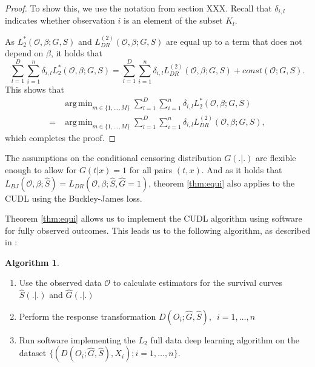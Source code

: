 \documentclass[12pt, a4paper]{article}
\theoremstyle{definition}
\newtheorem{Algorithm}{Algorithm}[section]
\theoremstyle{plain}
\numberwithin{equation}{section}
\numberwithin{figure}{section}
\numberwithin{table}{section}
\DeclareMathOperator*{\argmin}{arg\,min}
\begin{document}
\begin{proof}
		To show this, we use the notation from section XXX.
		Recall that $\delta_{i,l}$ indicates whether observation $i$ is an element of the subset $K_l$.
		
		As $L_2^*(\mathcal{O}, \beta; G,S)$ and $L_{DR}^{(2)}(\mathcal{O}, \beta; G,S)$ are equal up to a term that does not depend on $\beta$, it holds that
		\begin{equation*}
		\sum_{l=1}^{D} \sum_{i=1}^{n} \delta_{i,l} L_2^*(\mathcal{O}, \beta; G,S) = \sum_{l=1}^{D} \sum_{i=1}^{n} \delta_{i,l} L_{DR}^{(2)}(\mathcal{O}, \beta; G,S) + const(\mathcal{O}; G,S).
		\end{equation*}
		This shows that
		\begin{equation*}
		\begin{split}
		 &\argmin_{m \in \{1,\dots, M\}}\sum_{l=1}^{D} \sum_{i=1}^{n} \delta_{i,l} L_2^*(\mathcal{O}, \beta; G,S)\\
		  = &\argmin_{m \in \{1,\dots, M\}}\sum_{l=1}^{D} \sum_{i=1}^{n} \delta_{i,l} L_{DR}^{(2)}(\mathcal{O}, \beta; G,S),
		 \end{split}
		\end{equation*}
		which completes the proof.
	\end{proof}

	The assumptions on the conditional censoring distribution $G(.\vert .)$ are flexible enough to allow for $G(t\vert x)=1$ for all pairs $(t,x)$.
	And as it holds that $L_{BJ}(\mathcal{O}, \beta; \hat{S})=L_{DR}(\mathcal{O}, \beta; \hat{S}, \hat{G} = 1)$, theorem \ref{thm:equi} also applies to the CUDL using the Buckley-James loss.
	
	Theorem \ref{thm:equi} allows us to implement the CUDL algorithm using software for fully observed outcomes.
	This leads us to the following algorithm, as described in \citet*{basearticle}:
	\begin{Algorithm}~
		\begin{enumerate}
			\item Use the observed data $\mathcal{O}$ to calculate estimators for the survival curves $\hat{S}(.\vert.)$ and $\hat{G}(.\vert .)$
			\item Perform the response transformation $D(O_i; \hat{G},\hat{S}),$~$ i = 1,\dots,n$
			\item Run software implementing the $L_2$ full data deep learning algorithm on the dataset $\{(D(O_i; \hat{G},\hat{S}), X_i); i = 1,\dots,n\}$.
		\end{enumerate}
	\end{Algorithm}
\end{document}
